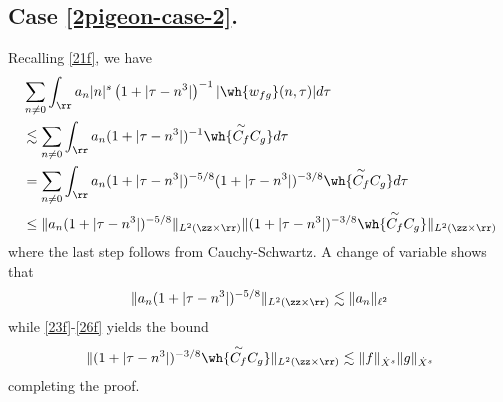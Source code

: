 \subsection{Case \eqref{2pigeon-case-2}.} Recalling \eqref{21f}, we have
%
\begin{equation}
	\begin{split}
		& \sum_{n \neq 0} \int_{\rr} a_n |n|^s \left( 1 + | \tau - n^3 | \right)^{-1} | 
		\wh{w_{fg}}(n, \tau) | d \tau
		\\
		& \lesssim \sum_{n \neq 0}  \int_{\rr} a_{n} (1+ | \tau - n^{3} |)^{-1} \wh{\overset{\sim}{C_f} C_g} d
		\tau
	\\	
	& = \sum_{n \neq 0} \int_{\rr} a_{n} (1+ | \tau - n^{3} |)^{-5/8} (1 + | \tau - n^{3}
	|)^{-3/8} \wh{\overset{\sim}{C_f} C_g} d
		\tau
		\\
		& \le \|a_{n} (1 + | \tau - n^{3} |)^{-5/8}\|_{L^2(\zz \times \rr)}  \| (1 +
		| \tau - n^{3} |)^{-3/8} \wh{\overset{\sim}{C_f} C_g}  \|_{L^2(\zz \times
		\rr)}
	\end{split}
\end{equation}
%
%
where the last step follows from Cauchy-Schwartz. A change of variable shows
that
%
%
\begin{equation*}
	\begin{split}
		\|a_{n} (1 + | \tau - n^{3} |)^{-5/8}\|_{L^2(\zz \times \rr)} \lesssim
		\|a_{n}\|_{\ell^2}
	\end{split}
\end{equation*}
%
%
while \eqref{23f}-\eqref{26f} yields the bound
%
%
\begin{equation*}
	\begin{split}
	\| (1 + | \tau - n^{3} |)^{-3/8} \wh{\overset{\sim}{C_f} C_g}  \|_{L^2(\zz
	\times \rr)} \lesssim \|f\|_{\dot{X}^s} \|g\|_{\dot{X}^s}
	\end{split}
\end{equation*}
%
%
completing the proof. \qquad \qedsymbol
%
%
%
